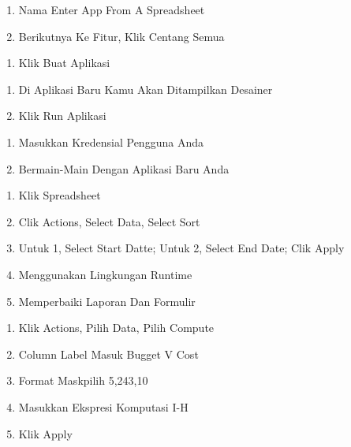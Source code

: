 \documentclass{article}
\begin{document}
\begin{enumerate}
    \item Nama Enter {App From A Spreadsheet}
	\item Berikutnya Ke Fitur, Klik Centang Semua\\

\end{enumerate}
\begin{enumerate}
    \item Klik Buat Aplikasi\\
\end{enumerate}
\begin{enumerate}
    \item Di Aplikasi Baru Kamu Akan Ditampilkan Desainer
    \item Klik Run Aplikasi\\

\end{enumerate}
\begin{enumerate}
    \item Masukkan Kredensial Pengguna Anda
    \item Bermain-Main Dengan Aplikasi Baru Anda\\

\end{enumerate}

\begin{enumerate}
    \item Klik Spreadsheet
    \item Clik Actions, Select Data, Select Sort
    \item Untuk 1, Select Start Datte; Untuk 2, Select End Date; Clik Apply
\item Menggunakan Lingkungan Runtime
\item Memperbaiki Laporan Dan Formulir\\

\end{enumerate}

\begin{enumerate}
    \item Klik Actions, Pilih Data, Pilih Compute
\item Column Label Masuk Bugget V Cost
\item Format Maskpilih 5,243,10
\item Masukkan Ekspresi Komputasi I-H
\item Klik Apply\\

\end{enumerate}
\end{document}
